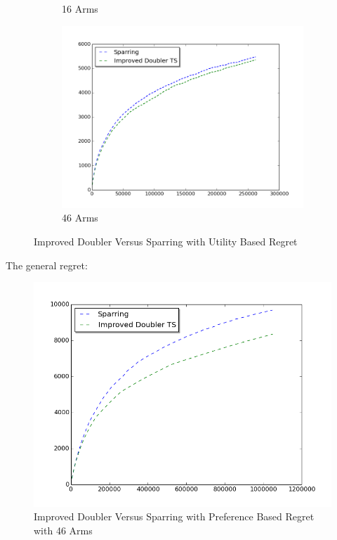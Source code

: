 \documentclass{llncs}
\begin{document}
\begin{figure}[h!]
\begin{subfigure}{.5\textwidth}
  \caption{16 Arms}
  \label{fig:sub2}
\end{subfigure}
\begin{subfigure}{.5\textwidth}
  \centering
  \includegraphics[scale=0.3, natwidth=410,natheight=442]{figures/improved_doubler_TS_sparring_MQ2007_46arms.png}
  \caption{46 Arms}
  \label{fig:sub2}
\end{subfigure}
\caption{Improved Doubler Versus Sparring with Utility Based Regret}
\label{fig:test}
\end{figure}

The general regret:
\begin{figure}[h!]
  \centering
     \includegraphics[scale=0.4, natwidth=410,natheight=442]{figures/improved_doubler_TS_sparring_MQ2007_general.png} 
  \caption{Improved Doubler Versus Sparring with Preference Based Regret with 46 Arms}
\end{figure}
\end{document}
